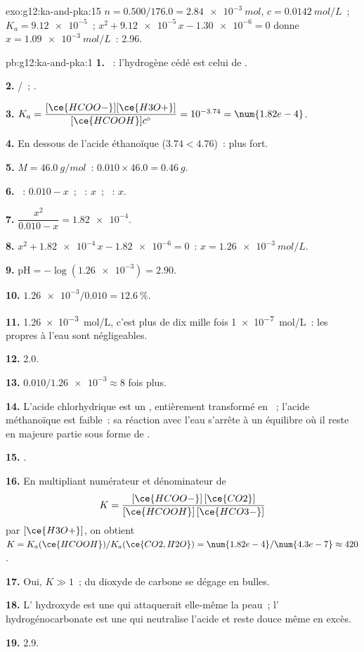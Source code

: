 \begin{solution}{exo:g12:ka-and-pka:15}
$n = 0.500 / 176.0 = \qty{2.84e-3}{mol}$, $c = \qty{0.0142}{mol/L}$~;
$K_a = \num{9.12e-5}$~; $x^2 + \num{9.12e-5}\,x - \num{1.30e-6} = 0$
donne
$x = \qty{1.09e-3}{mol/L}$~:  2.96.
\end{solution}

\begin{solution}{pb:g12:ka-and-pka:1}
\textbf{1.} ~: l'hydrogène cédé est celui de .

\textbf{2.} /~; .

\textbf{3.} $K_a = \dfrac{[\ce{HCOO-}][\ce{H3O+}]}{[\ce{HCOOH}]c^\circ} =
10^{-3.74} = \num{1.82e-4}$.

\textbf{4.} En dessous de l'acide éthanoïque ($3.74 < 4.76$)~: plus fort.

\textbf{5.} $M = \qty{46.0}{g/mol}$~: $0.010 \times 46.0 = \qty{0.46}{g}$.

\textbf{6.} ~: $0.010 - x$~; ~: $x$~; ~: $x$.

\textbf{7.} $\dfrac{x^2}{0.010 - x} = \num{1.82e-4}$.

\textbf{8.} $x^2 + \num{1.82e-4}\,x - \num{1.82e-6} = 0$~:
$x = \qty{1.26e-3}{mol/L}$.

\textbf{9.} $\mathrm{pH} = -\log(\num{1.26e-3}) = 2.90$.

\textbf{10.} $\num{1.26e-3}/0.010 = \qty{12.6}{\percent}$.

\textbf{11.} \qty{1.26e-3}{mol/L}, c'est plus de dix mille fois
\qty{1e-7}{mol/L}~: les  propres à l'eau sont négligeables.

\textbf{12.}  2.0.

\textbf{13.} $0.010 / \num{1.26e-3} \approx 8$ fois plus.

\textbf{14.} L'acide chlorhydrique est un , entièrement
transformé en ~; l'acide méthanoïque est faible~: sa réaction avec
l'eau s'arrête à un équilibre où il reste en majeure partie sous forme
de .

\textbf{15.} .

\textbf{16.} En multipliant numérateur et dénominateur de
\[
  K = \frac{[\ce{HCOO-}]\,[\ce{CO2}]}{[\ce{HCOOH}]\,[\ce{HCO3-}]}
\]
par $[\ce{H3O+}]$, on obtient $K = K_a(\ce{HCOOH}) / K_a(\ce{CO2,H2O}) =
\num{1.82e-4}/\num{4.3e-7} \approx 420$.

\textbf{17.} Oui, $K \gg 1$~; du dioxyde de carbone se dégage en bulles.

\textbf{18.} L' hydroxyde est une  qui attaquerait
elle-même la peau~; l' hydrogénocarbonate est une  qui
neutralise l'acide et reste douce même en excès.

\textbf{19.}  2.9.
\end{solution}
